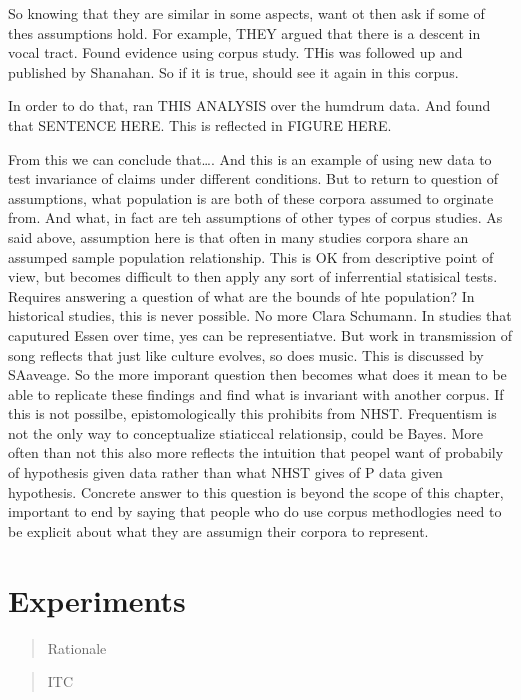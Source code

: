 \documentclass[]{book}
\begin{document}
So knowing that they are similar in some aspects, want ot then ask if some of thes assumptions hold.
For example, THEY argued that there is a descent in vocal tract.
Found evidence using corpus study.
THis was followed up and published by Shanahan.
So if it is true, should see it again in this corpus.

In order to do that, ran THIS ANALYSIS over the humdrum data.
And found that SENTENCE HERE.
This is reflected in FIGURE HERE.

From this we can conclude that\ldots{}.
And this is an example of using new data to test invariance of claims under different conditions.
But to return to question of assumptions, what population is are both of these corpora assumed to orginate from.
And what, in fact are teh assumptions of other types of corpus studies.
As said above, assumption here is that often in many studies corpora share an assumped sample population relationship.
This is OK from descriptive point of view, but becomes difficult to then apply any sort of inferrential statisical tests.
Requires answering a question of what are the bounds of hte population?
In historical studies, this is never possible.
No more Clara Schumann.
In studies that caputured Essen over time, yes can be representiatve.
But work in transmission of song reflects that just like culture evolves, so does music.
This is discussed by SAaveage.
So the more imporant question then becomes what does it mean to be able to replicate these findings and find what is invariant with another corpus.
If this is not possilbe, epistomologically this prohibits from NHST.
Frequentism is not the only way to conceptualize stiaticcal relationsip, could be Bayes.
More often than not this also more reflects the intuition that peopel want of probabily of hypothesis given data rather than what NHST gives of P data given hypothesis.
Concrete answer to this question is beyond the scope of this chapter, important to end by saying that people who do use corpus methodlogies need to be explicit about what they are assumign their corpora to represent.

\hypertarget{experiments}{%
\chapter{Experiments}\label{experiments}}

\begin{quote}
Rationale
\end{quote}

\begin{quote}
ITC
\end{quote}
\end{document}
